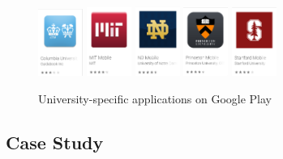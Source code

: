         \begin{figure}[ht]
            \centering
                 \includegraphics[width=0.13\textwidth]{figures/uni_apps/store_entries/columbia.png}
                 \includegraphics[width=0.13\textwidth]{figures/uni_apps/store_entries/mit.png}
                 \includegraphics[width=0.13\textwidth]{figures/uni_apps/store_entries/notre_dame.png}
                 \includegraphics[width=0.13\textwidth]{figures/uni_apps/store_entries/princeton.png}
                 \includegraphics[width=0.13\textwidth]{figures/uni_apps/store_entries/stanford.png}
            \caption{University-specific applications on Google Play}
            \label{2:fig:uni_apps}
        \end{figure}
    
    \subsection{Case Study} \label{2:uni_apps_case_study}

